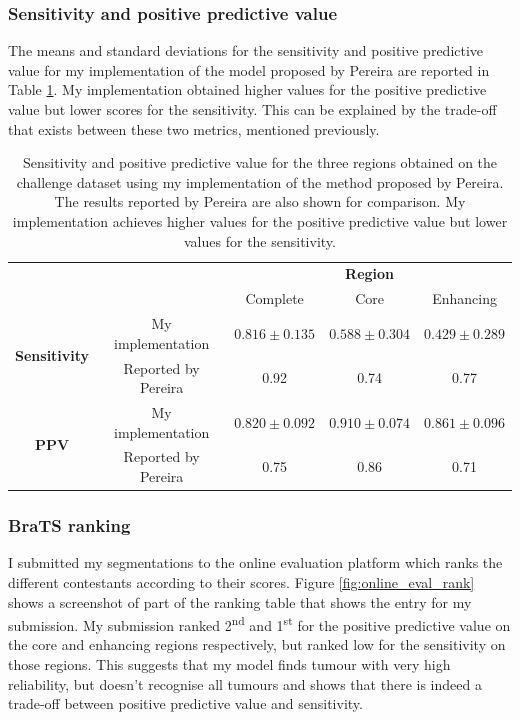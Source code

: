 \documentclass[12pt,a4paper,twoside,openright]{report}
\begin{document}
\subsubsection{Sensitivity and positive predictive value}
The means and standard deviations for the sensitivity and positive predictive value for my implementation of the model proposed by Pereira are reported in Table \ref{table:pereira_sensitivity_average}. My implementation obtained higher values for the positive predictive value but lower scores for the sensitivity. This can be explained by the trade-off that exists between these two metrics, mentioned previously.

\begin{table}
\centering	
{\def\arraystretch{1.3}\tabcolsep=5pt
\begin{tabular}{ c  c | c | c | c} 
& \multicolumn{1}{c}{} & \multicolumn{3}{c}{\textbf{Region}} \\
& & Complete & Core & Enhancing \\
\cline{2-5}
\multirow{2}{*}{\textbf{Sensitivity}} & My implementation &	 $0.816 \pm 0.135$ & $0.588 \pm 0.304$  & $0.429 \pm 0.289$ \\
& Reported by Pereira  & 0.92 & 0.74 & 0.77 \\
\cline{2-5}
\multirow{2}{*}{\textbf{PPV}} & My implementation & $0.820 \pm 0.092$ & $0.910 \pm 0.074$ & $0.861 \pm 0.096$ \\
& Reported by Pereira & 0.75 & 0.86 & 0.71 \\
\end{tabular}
}
\caption[Sensitivity and positive predictive value for the three regions obtained on the challenge dataset using my implementation of the method proposed by Pereira.]{Sensitivity and positive predictive value for the three regions obtained on the challenge dataset using my implementation of the method proposed by Pereira. The results reported by Pereira are also shown for comparison. My implementation achieves higher values for the positive predictive value but lower values for the sensitivity.}
\label{table:pereira_sensitivity_average}
\end{table}

\subsubsection{BraTS ranking}
I submitted my segmentations to the online evaluation platform which ranks the different contestants according to their scores. Figure \ref{fig:online_eval_rank} shows a screenshot of part of the ranking table that shows the entry for my submission. My submission ranked 2\textsuperscript{nd} and 1\textsuperscript{st} for the positive predictive value on the core and enhancing regions respectively, but ranked low for the sensitivity on those regions. This suggests that my model finds tumour with very high reliability, but doesn't recognise all tumours and shows that there is indeed a trade-off between positive predictive value and sensitivity.
\end{document}
